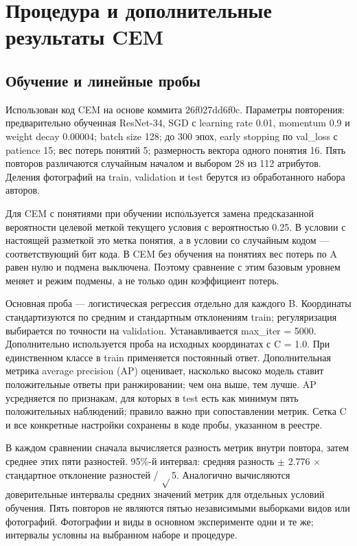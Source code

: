 
\section{Процедура и дополнительные результаты CEM}\label{app:cem}

\subsection{Обучение и линейные пробы}

Использован код CEM на основе коммита 26f027dd6f0c. Параметры повторения: предварительно обученная ResNet-34, SGD с learning rate 0.01, momentum 0.9 и weight decay 0.00004; batch size 128; до 300 эпох, early stopping по val\_loss с patience 15; вес потерь понятий 5; размерность вектора одного понятия 16. Пять повторов различаются случайным началом и выбором 28 из 112 атрибутов. Деления фотографий на train, validation и test берутся из обработанного набора авторов.

Для CEM с понятиями при обучении используется замена предсказанной вероятности целевой меткой текущего условия с вероятностью 0.25. В условии с настоящей разметкой это метка понятия, а в условии со случайным кодом — соответствующий бит кода. В CEM без обучения на понятиях вес потерь по A равен нулю и подмена выключена. Поэтому сравнение с этим базовым уровнем меняет и режим подмены, а не только один коэффициент потерь.

Основная проба — логистическая регрессия отдельно для каждого B. Координаты стандартизуются по средним и стандартным отклонениям train; регуляризация выбирается по точности на validation. Устанавливается max\_iter = 5000. Дополнительно используется проба на исходных координатах с C = 1.0. При единственном классе в train применяется постоянный ответ. Дополнительная метрика average precision (AP) оценивает, насколько высоко модель ставит положительные ответы при ранжировании; чем она выше, тем лучше. AP усредняется по признакам, для которых в test есть как минимум пять положительных наблюдений; правило важно при сопоставлении метрик. Сетка C и все конкретные настройки сохранены в коде пробы, указанном в реестре.

В каждом сравнении сначала вычисляется разность метрик внутри повтора, затем среднее этих пяти разностей. 95\%-й интервал: средняя разность $\pm$ 2.776 $\times$ стандартное отклонение разностей / $\sqrt{}$5. Аналогично вычисляются доверительные интервалы средних значений метрик для отдельных условий обучения. Пять повторов не являются пятью независимыми выборками видов или фотографий. Фотографии и виды в основном эксперименте одни и те же; интервалы условны на выбранном наборе и процедуре.

